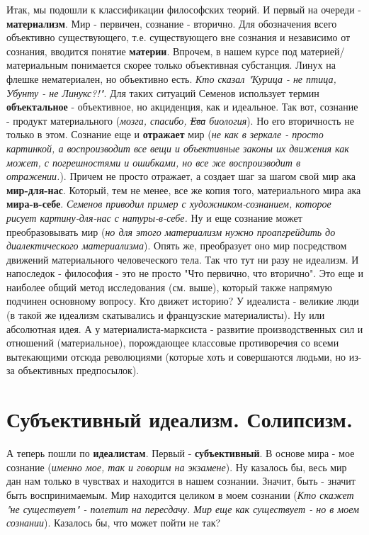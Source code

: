 Итак, мы подошли к классификации философских теорий. И первый на очереди - \textbf{материализм}. Мир - первичен, сознание - вторично. Для обозначения всего объективно существующего, т.е. существующего вне сознания и независимо от сознания, вводится понятие \textbf{материи}. Впрочем, в нашем курсе под материей/материальным понимается скорее только объективная субстанция. Линух на флешке нематериален, но объективно есть. \textit{Кто сказал "Курица - не птица, Убунту - не Линукс?!"}. Для таких ситуаций Семенов использует термин \textbf{объектальное} - объективное, но акциденция, как и идеальное. Так вот, сознание - продукт материального (\textit{мозга, спасибо, \sout{Ева} биология}). Но его вторичность не только в этом. Сознание еще и \textbf{отражает} мир (\textit{не как в зеркале - просто картинкой, а воспроизводит все вещи и объективные законы их движения как может, с погрешностями и ошибками, но все же воспроизводит в отражении.}). Причем не просто отражает, а создает шаг за шагом свой мир ака \textbf{мир-для-нас}. Который, тем не менее, все же копия того, материального мира ака \textbf{мира-в-себе}. \textit{Семенов приводил пример с художником-сознанием, которое рисует картину-для-нас с натуры-в-себе.} Ну и еще сознание может преобразовывать мир (\textit{но для этого материализм нужно проапгрейдить до диалектического материализма}). Опять же, преобразует оно мир посредством движений материального человеческого тела. Так что тут ни разу не идеализм. И напоследок - философия - это не просто "Что первично, что вторично". Это еще и наиболее общий метод исследования (см. выше), который также напрямую подчинен основному вопросу. Кто движет историю? У идеалиста - великие люди (в такой же идеализм скатывались и французские материалисты). Ну или абсолютная идея. А у материалиста-марксиста - развитие производственных сил и отношений (материальное), порождающее классовые противоречия со всеми вытекающими отсюда революциями (которые хоть и совершаются людьми, но из-за объективных предпосылок). 

\section{ Субъективный идеализм. Солипсизм.}
А теперь пошли по \textbf{идеалистам}. Первый - \textbf{субъективный}. В основе мира - мое сознание (\textit{именно мое, так и говорим на экзамене}). Ну казалось бы, весь мир дан нам только в чувствах и находится в нашем сознании. Значит, быть - значит быть воспринимаемым. Мир находится целиком в моем сознании (\textit{Кто скажет "не существует" - полетит на пересдачу. Мир еще как существует - но в моем сознании}). Казалось бы, что может пойти не так? 

